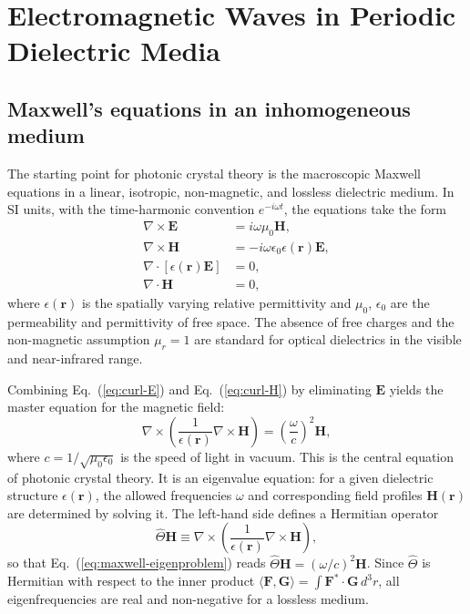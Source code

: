 \documentclass[12pt,a4paper,oneside]{book}
\theoremstyle{plain}
\theoremstyle{definition}
\theoremstyle{remark}
\newcommand{\eqnref}[1]{Eq.~(\ref{#1})}
\newcommand{\vb}[1]{\bm{#1}}
\newcommand{\Hfield}{\vb{H}}
\newcommand{\Efield}{\vb{E}}
\newcommand{\eps}{\epsilon}
\newcommand{\om}{\omega}
\newcommand{\rvec}{\vb{r}}
\begin{document}
\chapter{Electromagnetic Waves in Periodic Dielectric Media}
\label{chap:periodic-media}

\section{Maxwell's equations in an inhomogeneous medium}
\label{sec:maxwell}

The starting point for photonic crystal theory is the macroscopic Maxwell equations in a linear, isotropic, non-magnetic, and lossless dielectric medium. In SI units, with the time-harmonic convention $e^{-i\om t}$, the equations take the form
\begin{align}
  \nabla \times \Efield &= i\om\mu_0 \Hfield, \label{eq:curl-E}\\
  \nabla \times \Hfield &= -i\om\eps_0\eps(\rvec)\Efield, \label{eq:curl-H}\\
  \nabla \cdot [\eps(\rvec)\Efield] &= 0, \label{eq:div-E}\\
  \nabla \cdot \Hfield &= 0, \label{eq:div-H}
\end{align}
where $\eps(\rvec)$ is the spatially varying relative permittivity and $\mu_0$, $\eps_0$ are the permeability and permittivity of free space. The absence of free charges and the non-magnetic assumption $\mu_r = 1$ are standard for optical dielectrics in the visible and near-infrared range.

Combining \eqnref{eq:curl-E} and \eqnref{eq:curl-H} by eliminating $\Efield$ yields the master equation for the magnetic field:
\begin{equation}
  \nabla \times \left( \frac{1}{\eps(\rvec)} \nabla \times \Hfield \right)
  = \left( \frac{\om}{c} \right)^2 \Hfield,
  \label{eq:maxwell-eigenproblem}
\end{equation}
where $c = 1/\sqrt{\mu_0\eps_0}$ is the speed of light in vacuum. This is the central equation of photonic crystal theory. It is an eigenvalue equation: for a given dielectric structure $\eps(\rvec)$, the allowed frequencies $\om$ and corresponding field profiles $\Hfield(\rvec)$ are determined by solving it. The left-hand side defines a Hermitian operator
\begin{equation}
  \hat{\Theta}\Hfield \equiv \nabla \times \left(\frac{1}{\eps(\rvec)}\nabla\times\Hfield\right),
\end{equation}
so that \eqnref{eq:maxwell-eigenproblem} reads $\hat{\Theta}\Hfield = (\om/c)^2\Hfield$. Since $\hat{\Theta}$ is Hermitian with respect to the inner product $\langle \vb{F}, \vb{G}\rangle = \int \vb{F}^*\cdot\vb{G}\,d^3r$, all eigenfrequencies are real and non-negative for a lossless medium.
\end{document}
